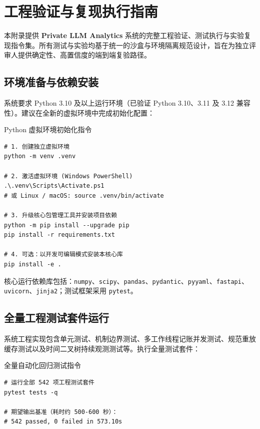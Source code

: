 \section{工程验证与复现执行指南}
\label{app:tests}

本附录提供 \textbf{Private LLM Analytics} 系统的完整工程验证、测试执行与实验复现指令集。所有测试与实验均基于统一的沙盒与环境隔离规范设计，旨在为独立评审人提供确定性、高置信度的端到端复验路径。

\subsection{环境准备与依赖安装}

系统要求 Python 3.10 及以上运行环境（已验证 Python 3.10、3.11 及 3.12 兼容性）。建议在全新的虚拟环境中完成初始化配置：

\begin{techbox}{Python 虚拟环境初始化指令}
\begin{verbatim}
# 1. 创建独立虚拟环境
python -m venv .venv

# 2. 激活虚拟环境 (Windows PowerShell)
.\.venv\Scripts\Activate.ps1
# 或 Linux / macOS: source .venv/bin/activate

# 3. 升级核心包管理工具并安装项目依赖
python -m pip install --upgrade pip
pip install -r requirements.txt

# 4. 可选：以开发可编辑模式安装本核心库
pip install -e .
\end{verbatim}
\end{techbox}

核心运行依赖库包括：\texttt{numpy}、\texttt{scipy}、\texttt{pandas}、\texttt{pydantic}、\texttt{pyyaml}、\texttt{fastapi}、\texttt{uvicorn}、\texttt{jinja2}；测试框架采用 \texttt{pytest}。

\subsection{全量工程测试套件运行}

系统工程实现包含单元测试、机制边界测试、多工作线程记账并发测试、规范重放缓存测试以及时间二叉树持续观测测试等。执行全量测试套件：

\begin{techbox}{全量自动化回归测试指令}
\begin{verbatim}
# 运行全部 542 项工程测试套件
pytest tests -q

# 期望输出基准（耗时约 500-600 秒）：
# 542 passed, 0 failed in 573.10s
\end{verbatim}
\end{techbox}

